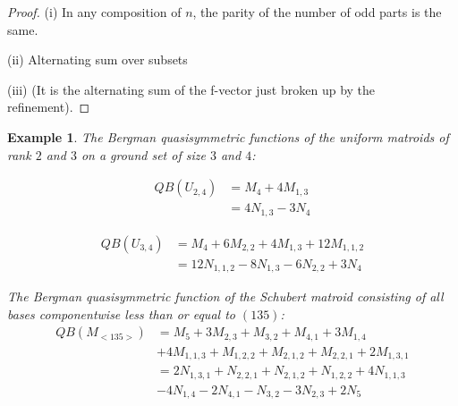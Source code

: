 \documentclass[12pt,reqno]{amsart}
\numberwithin{definition}{section}
\newtheorem{example}[definition]{Example}
\begin{document}
\begin{proof}

(i) In any composition of $n$, the parity of the number of odd parts is the same.

(ii) Alternating sum over subsets

(iii) (It is the alternating sum of the f-vector just broken up by the refinement).

\end{proof}

\begin{example}


The Bergman quasisymmetric functions of the uniform matroids of rank $2$ and $3$ on a ground set of size $3$ and $4$:

\begin{align*}
QB(U_{2,4}) & = M_4 + 4M_{1,3}\\
& = 4N_{1,3} - 3N_4
\end{align*}

\begin{align*}
QB(U_{3,4}) & =  M_4 + 6M_{2,2} + 4M_{1,3} + 12M_{1,1,2}\\
            & =  12 N_{1,1,2} - 8 N_{1,3} - 6N_{2,2} + 3N_4
\end{align*}

The Bergman quasisymmetric function of the Schubert matroid consisting of all bases componentwise less than or equal to $(135)$:
\begin{align*}
QB(M_{<135>}) & =  M_5 + 3M_{2,3} + M_{3,2} + M_{4,1} + 3M_{1,4} \\ & + 4M_{1,1,3} + M_{1,2,2} + M_{2,1,2} + M_{2,2,1} + 2M_{1,3,1}\\
&  =  2N_{1,3,1} + N_{2,2,1} + N_{2,1,2} + N_{1,2,2} + 4N_{1,1,3} \\ & - 4 N_{1,4} - 2N_{4,1} - N_{3,2} - 3N_{2,3} + 2N_5
\end{align*}

\end{example}




\end{document}
